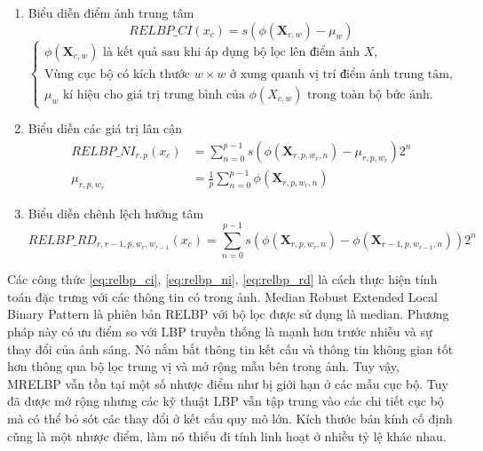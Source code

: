 \begin{enumerate}
    \item Biểu diễn điểm ảnh trung tâm 
    \begin{equation}
        RELBP\_CI(x_c) = s(\phi(\mathbf{X}_{c, w}) - \mu_w)
         \label{eq:relbp_ci}
    \end{equation}
    $\begin{cases}
    \phi(\mathbf{X}_{c,w}) \text{ là kết quả sau khi áp dụng bộ lọc lên điểm ảnh } X, \\
    \text{Vùng cục bộ có kích thước } w \times w \text{ ở xung quanh vị trí điểm ảnh trung tâm}, \\
    \mu_w \text{ kí hiệu cho giá trị trung bình của } \phi(X_{c,w}) \text{ trong toàn bộ bức ảnh}.
\end{cases}$



    \item Biểu diễn các giá trị lân cận
\begin{equation}
    \begin{aligned}
        RELBP\_NI_{r, p}(x_c) &= \sum_{n=0}^{p-1}s(\phi(\mathbf{X}_{r, p, w_r, n}) - \mu_{r, p, w_r}) 2^n \\
        \mu_{r, p, w_r} &= \frac{1}{p}\sum_{n =0}^{p-1}\phi(\mathbf{X}_{r, p, w_r, n})
    \end{aligned}
             \label{eq:relbp_ni}
\end{equation}

    \item Biểu diễn chênh lệch hướng tâm
    \begin{equation}
        RELBP\_RD_{r, r-1, p, w_r, w_{r-1}}(x_c) = \sum_{n=0}^{p-1}s(\phi(\mathbf{X}_{r, p, w_r, n}) - \phi(\mathbf{X}_{r-1, p, w_{r-1}, n}))2^n
             \label{eq:relbp_rd}
\end{equation}
\end{enumerate}

Các công thức \ref{eq:relbp_ci}, \ref{eq:relbp_ni}, \ref{eq:relbp_rd} là cách thực hiện tính toán đặc trưng với các thông tin có trong ảnh. Median Robust Extended Local Binary Pattern là phiên bản RELBP với bộ lọc được sử dụng là median. Phương pháp này có ưu điểm so với LBP truyền thống là mạnh hơn trước nhiễu và sự thay đổi của ảnh sáng. Nó nắm bắt thông tin kết cấu và thông tin không gian tốt hơn thông qua bộ lọc trung vị và mở rộng mẫu bên trong ảnh. Tuy vậy, MRELBP vẫn tồn tại một số nhược điểm như bị giới hạn ở các mẫu cục bộ. Tuy đã được mở rộng nhưng các kỹ thuật LBP vẫn tập trung vào các chi tiết cục bộ mà có thể bỏ sót các thay đổi ở kết cấu quy mô lớn. Kích thước bán kính cố định cũng là một nhược điểm, làm nó thiếu đi tính linh hoạt ở nhiều tỷ lệ khác nhau.

